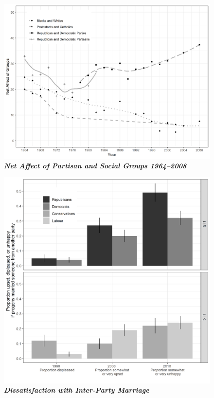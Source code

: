 \documentclass[12pt]{article}
\begin{document}
\begin{figure}[H]
\center\includegraphics[width=5in]{fig_3.png}
\caption{\label{fig:3} \textit{\textbf{Net Affect of Partisan and Social Groups 1964--2008}}}
\end{figure}

\begin{figure}[H]
\center\includegraphics[width=5in]{fig_4.png}
\caption{\label{fig:4} \textit{\textbf{Dissatisfaction with Inter-Party Marriage}}}
\end{figure}
\end{document}
